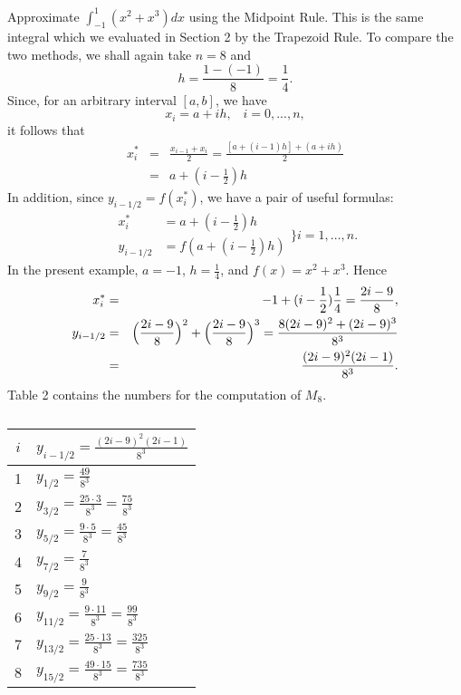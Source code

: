 \begin{example}
Approximate $\int_{-1}^1 (x^2 + x^3) dx$ using the Midpoint Rule. This is the same integral which we evaluated in Section 2 by the Trapezoid Rule. To compare the two methods, we shall again take $n = 8$ and
$$
h = \frac{1- (-1)}{8} = \frac{1}{4}.
$$
\noindent Since, for an arbitrary interval $[a, b]$, we have
$$
x_i = a + ih, \;\;\; i = 0, ... ,n,
$$
\noindent it follows that
\begin{eqnarray*}  
x_i^{*} &=& \frac{x_{i-1} + x_i}{2} = \frac{[a + (i - 1)h] + (a + ih)}{2}\\
           &=& a + (i - \frac{1}{2})h 
\end{eqnarray*} 
\noindent In addition, since $y_{i-1/2} = f(x_i^{*})$, we have a pair of useful formulas: 
$$
    \begin{array}{rl}
   x_i^{*} &= a + (i - \frac{1}{2})h  \\
y_{i-1/2} &= f(a + (i - \frac{1}{2})h)  
   \end{array}
                              \} i = 1, ... , n.
$$
\noindent In the present example, $a = -1$, $h = \frac{1}{4}$, and $f(x) = x^2 + x^3$. Hence 
\begin{eqnarray*}  
    x_i^{*} &=& -1 + (i - \frac{1}{2})\frac{1}{4} = \frac{2i - 9}{8}, \\
y_{i- 1/2} &=& \Bigl( \frac{2i - 9}{8} \Bigr)^2 + \Bigl( \frac{2i - 9}{8} \Bigr)^3 = \frac{8(2i - 9)^2 + (2i - 9)^3}{8^3} \\
               &=& \frac{(2i - 9)^2(2i - 1)}{8^3}  .
\end{eqnarray*} 
\noindent Table 2 contains the numbers for the computation of $M_8$.

\begin{table}\label{table 8.2}
\centering
\begin{tabular}{c|l} \hline  
$i$& $y_{i - 1/2} = \frac{(2i - 9)^2(2i - 1)}{8^3}$   \vspace {1ex}\\ \hline
1   & $y_{1/2} = \frac{49}{8^3}$   \\
2   & $y_{3/2} = \frac{25 \cdot 3}{8^3} = \frac{75}{8^3}$   \\
3   & $y_{5/2} = \frac{9 \cdot 5}{8^3} = \frac{45}{8^3}$   \\
4   & $y_{7/2} = \frac{7}{8^3}$  \\
5   & $y_{9/2} = \frac{9}{8^3}$ \\
6   & $y_{11/2} = \frac{9 \cdot 11}{8^3} = \frac{99}{8^3}$  \\
7   & $y_{13/2} = \frac{25 \cdot 13}{8^3} = \frac{325}{8^3}$ \\
8   & $y_{15/2} = \frac{49 \cdot 15}{8^3} = \frac{735}{8^3}$  \\  \hline
\end{tabular}
\caption{}
\end{table}


\end{example}
